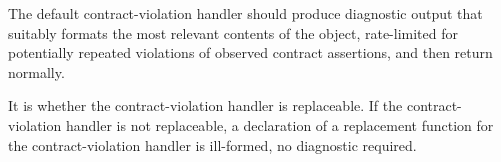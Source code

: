 \pnum
\recommended
The default contract-violation handler
should produce diagnostic output
that suitably formats the most relevant contents
of the  object,
rate-limited for potentially repeated violations
of observed contract assertions,
and then return normally.

\pnum
It is
whether the contract-violation handler
is replaceable.
If the contract-violation handler
is not replaceable,
a declaration of a replacement function for the contract-violation handler
is ill-formed, no diagnostic required.

